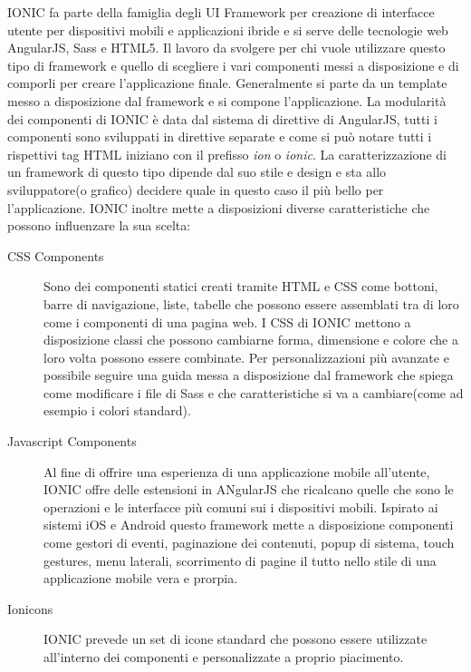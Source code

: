 IONIC fa parte della famiglia degli UI Framework per creazione di interfacce utente per dispositivi mobili e applicazioni ibride e si serve delle tecnologie web AngularJS, Sass e HTML5.
Il lavoro da svolgere per chi vuole utilizzare questo tipo di framework e quello di scegliere i vari componenti messi a disposizione e di comporli per creare l'applicazione finale. Generalmente si parte da un template messo a disposizione dal framework e si compone l'applicazione. La modularità dei componenti di IONIC è data dal sistema di direttive di AngularJS, tutti i componenti sono sviluppati in direttive separate e come si può notare tutti i rispettivi tag HTML iniziano con il prefisso \textit{ion} o \textit{ionic}. 
La caratterizzazione di un framework di questo tipo dipende dal suo stile e design e sta allo sviluppatore(o  grafico) decidere quale in questo caso il più bello per l'applicazione. IONIC inoltre mette a disposizioni diverse caratteristiche che possono influenzare la sua scelta:
\begin{description}
\item[CSS Components]
Sono dei componenti statici creati tramite HTML e CSS come bottoni, barre di navigazione, liste, tabelle che possono essere assemblati tra di loro come i componenti di una pagina web. I CSS di IONIC mettono a disposizione classi che possono cambiarne forma, dimensione e colore che a loro volta possono essere combinate.
Per personalizzazioni più avanzate e possibile seguire una guida messa a disposizione dal framework che spiega come modificare i file di Sass e che caratteristiche si va a cambiare(come ad esempio i colori standard).
\item[Javascript Components]
Al fine di offrire una esperienza di una applicazione mobile all'utente, IONIC offre delle estensioni in ANgularJS che ricalcano quelle che sono le operazioni e le interfacce più comuni sui i dispositivi mobili. Ispirato ai sistemi iOS e Android questo framework mette a disposizione componenti come gestori di eventi, paginazione dei contenuti, popup di sistema, touch gestures, menu laterali, scorrimento di pagine il tutto nello stile di una applicazione mobile vera e prorpia.
\item[Ionicons]
IONIC prevede un set di icone standard che possono essere utilizzate all'interno dei componenti e personalizzate a proprio piacimento.

\end{description} 
